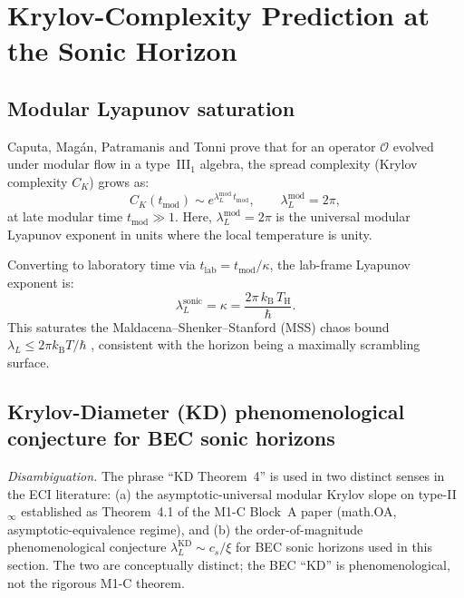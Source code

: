 \documentclass[12pt,a4paper]{article}
\renewcommand{\TH}{T_{\mathrm{H}}}
\newcommand{\lambdaL}{\lambda_L^{\mathrm{sonic}}}
\newcommand{\kB}{k_{\mathrm{B}}}
\begin{document}
\section{Krylov-Complexity Prediction at the Sonic Horizon}
\label{sec:krylov}

\subsection{Modular Lyapunov saturation}

Caputa, Mag\'an, Patramanis and Tonni \cite{caputa2023} prove that for an
operator $\mathcal{O}$ evolved under modular flow in a type~III$_1$
algebra, the spread complexity (Krylov complexity $C_K$) grows as:
\begin{equation}
  C_K(t_{\mathrm{mod}}) \sim e^{\lambda_L^{\mathrm{mod}}\,t_{\mathrm{mod}}},
  \qquad \lambda_L^{\mathrm{mod}} = 2\pi,
\end{equation}
at late modular time $t_{\mathrm{mod}} \gg 1$.
Here, $\lambda_L^{\mathrm{mod}} = 2\pi$ is the universal modular Lyapunov
exponent in units where the local temperature is unity.

Converting to laboratory time via $t_{\mathrm{lab}} =
t_{\mathrm{mod}}/\kappa$, the lab-frame Lyapunov exponent is:
\begin{equation}
  \boxed{\lambdaL = \kappa = \frac{2\pi\,\kB\,\TH}{\hbar}.}
  \label{eq:lambdaL}
\end{equation}
This saturates the Maldacena--Shenker--Stanford (MSS) chaos bound
$\lambda_L \leq 2\pi\kB T/\hbar$ \cite{mss2016}, consistent with the
horizon being a maximally scrambling surface.

\subsection{Krylov-Diameter (KD) phenomenological conjecture for BEC sonic horizons}

\emph{Disambiguation.} The phrase ``KD Theorem~4'' is used in two
distinct senses in the ECI literature: (a) the asymptotic-universal
modular Krylov slope on type-II$_\infty$ established as Theorem~4.1
of the M1-C Block~A paper (math.OA, asymptotic-equivalence regime),
and (b) the order-of-magnitude phenomenological conjecture
$\lambda_L^{\mathrm{KD}} \sim c_s/\xi$ for BEC sonic horizons used in
this section. The two are conceptually distinct; the BEC ``KD'' is
phenomenological, not the rigorous M1-C theorem.
\end{document}
